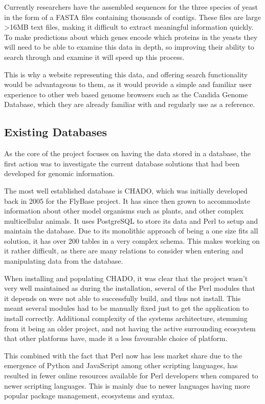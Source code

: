 Currently researchers have the assembled sequences for the three species of yeast in the form of a FASTA files containing thousands of contigs. These files are large \textgreater 16MB text files, making it difficult to extract meaningful information quickly. To make predictions about which genes encode which proteins in the yeasts they will need to be able to examine this data in depth, so improving their ability to search through and examine it will speed up this process.

This is why a website representing this data, and offering search functionality would be advantageous to them, as it would provide a simple and familiar user experience to other web based genome browsers such as the Candida Genome Database\cite{cgd}, which they are already familiar with and regularly use as a reference. 

\subsection{Existing Databases}
As the core of the project focuses on having the data stored in a database, the first action was to investigate the current database solutions that had been developed for genomic information. 

The most well established database is CHADO\cite{chado}, which was initially developed back in 2005 for the FlyBase\cite{flybase} project. It has since then grown to accommodate information about other model organisms such as plants, and other complex multicellular animals. It uses PostgreSQL\cite{postgres} to store its data and Perl\cite{perl} to setup and maintain the database. Due to its monolithic approach of being a one size fits all solution, it has over 200 tables in a very complex schema. This makes working on it rather difficult, as there are many relations to consider when entering and manipulating data from the database.

When installing and populating CHADO, it was clear that the project wasn't very well maintained as during the installation, several of the Perl modules that it depends on were not able to successfully build, and thus not install. This meant several modules had to be manually fixed just to get the application to install correctly. Additional complexity of the systems architecture, stemming from it being an older project, and not having the active surrounding ecosystem that other platforms have, made it a less favourable choice of platform.

This combined with the fact that Perl now has less market share\cite{perl-market} due to the emergence of Python\cite{python} and JavaScript\cite{node} among other scripting languages, has resulted in fewer online resources available for Perl developers when compared to newer scripting languages. This is mainly due to newer languages having more popular package management, ecosystems and syntax. 

